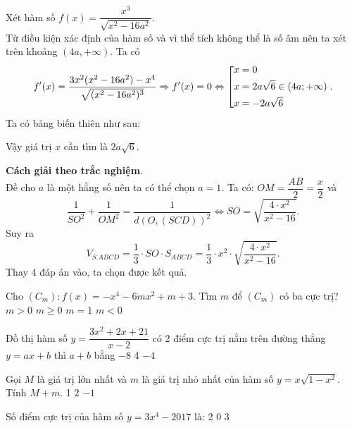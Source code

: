\begin{ex}
{Xét hàm số $f(x)=\dfrac{x^3}{\sqrt{x^2-16a^2}}$. \\
Từ điều kiện xác định của hàm số và vì thể tích không thể là số âm nên ta xét trên khoảng $(4a, +\infty)$. Ta có 
$$f'(x)=\dfrac{3x^2(x^2-16a^2)-x^4}{\sqrt{(x^2-16a^2)^3}} \Rightarrow f'(x)=0 \Leftrightarrow \left[\begin{aligned}&x=0\\&x= 2a\sqrt{6} \in (4a; +\infty)\\&x=-2a\sqrt{6}\end{aligned}\right..$$ Ta có bảng biến thiên như sau:
\begin{center}
\end{center}
Vậy giá trị $x$ cần tìm là $2a\sqrt{6}$.

\textbf{Cách giải theo trắc nghiệm}.\\
Đề cho $a$ là một hằng số nên ta có thể chọn $a=1$. Ta có: $OM=\dfrac{AB}{2}=\dfrac{x}{2}$ và
$$\dfrac{1}{SO^2}+\dfrac{1}{OM^2}=\dfrac{1}{d(O, (SCD))^2 }\Leftrightarrow SO=\sqrt{\dfrac{4\cdot x^2}{x^2-16}}.$$
Suy ra 
$$V_{S.ABCD}=\dfrac{1}{3}\cdot SO\cdot S_{ABCD}=\dfrac{1}{3}\cdot x^2\cdot \sqrt{\dfrac{4\cdot x^2}{x^2-16}}.$$
Thay 4 đáp án vào, ta chọn được kết quả.
}
\end{ex}
\begin{ex}%
Cho $({{C}_{m}}):f(x)=-{{x}^{4}}-6m{{x}^{2}}+m+3$. Tìm $m$ để $({{C}_{m}})$ có ba cực trị?
\choice
{$m>0$}
{$m\ge 0$}
{$m=1$}
{\True $m<0$}
\end{ex}
\begin{ex}%
Đồ thị hàm số $y=\dfrac{3{{x}^{2}}+2x+21}{x-2}$ có 2 điểm cực trị nằm trên đường thẳng $y=ax+b$ thì $a+b$ bằng
\choice
{$-8$}
{4}
{}
{$-4$}
\end{ex}
\begin{ex}%
Gọi $M$ là giá trị lớn nhất và $m$ là giá trị nhỏ nhất của hàm số $y=x\sqrt{1-{{x}^{2}}}$. Tính $M+m$.
\choice
{1}
{}
{2}
{$-1$}
\end{ex}
\begin{ex}%
Số điểm cực trị của hàm số $y=3{{x}^{4}}-2017$ là:
\choice
{}
{2}
{0}
{3}
\end{ex}
